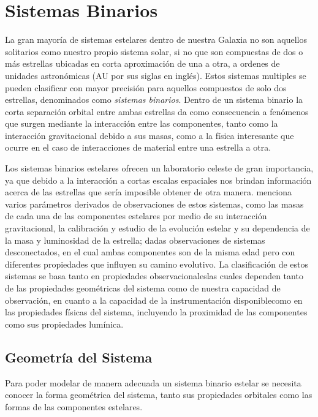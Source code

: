 \section{Sistemas Binarios}

La gran mayoría de sistemas estelares dentro de nuestra Galaxia no son aquellos
solitarios como nuestro propio sistema solar, si no que son compuestas de dos o
más estrellas ubicadas en corta aproximación de una a otra, a ordenes de
unidades astronómicas (AU por sus siglas en inglés). Estos sistemas multiples se
pueden clasificar con mayor precisión para aquellos compuestos de solo dos
estrellas, denominados como \textit{sistemas binarios}. Dentro de un sistema
binario la corta separación orbital entre ambas estrellas da como consecuencia a
fenómenos que surgen mediante la interacción entre las componentes, tanto como
la interacción gravitacional debido a sus masas, como a la física interesante
que ocurre en el caso de interacciones de material entre una estrella a otra. 

Los sistemas binarios estelares ofrecen un laboratorio celeste de gran
importancia, ya que debido a la interacción a cortas escalas espaciales nos
brindan información acerca de las estrellas que sería imposible obtener de otra
manera.  menciona varios
parámetros derivados de observaciones de estos sistemas, como las masas de cada
una de las componentes estelares por medio de su interacción gravitacional, la
calibración y estudio de la evolución estelar y su dependencia de la masa y
luminosidad de la estrella; dadas observaciones de sistemas desconectados, en el
cual ambas componentes son de la misma edad pero con diferentes propiedades que
influyen su camino evolutivo. La clasificación de estos sistemas se basa tanto
en propiedades observacionales\textemdash las cuales dependen tanto de las
propiedades geométricas del sistema como de nuestra capacidad de observación, en
cuanto a la capacidad de la instrumentación disponible\textemdash como en las
propiedades físicas del sistema, incluyendo la proximidad de las componentes
como sus propiedades lumínica.

\subsection{Geometría del Sistema}

Para poder modelar de manera adecuada un sistema binario estelar se necesita
conocer la forma geométrica del sistema, tanto sus propiedades orbitales como
las formas de las componentes estelares. 

